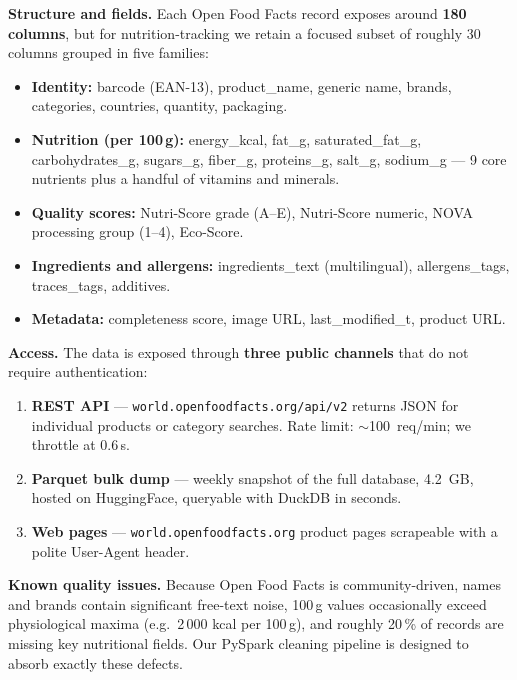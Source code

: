 \documentclass[a4paper,11pt,oneside,openany]{report}
\newcommand{\off}{Open Food Facts}
\begin{document}
\textbf{Structure and fields.} Each \off{} record exposes around
\textbf{180 columns}, but for nutrition-tracking we retain a focused
subset of roughly 30 columns grouped in five families:

\begin{itemize}[nosep]
  \item \textbf{Identity:} barcode (EAN-13), product\_name, generic
        name, brands, categories, countries, quantity, packaging.
  \item \textbf{Nutrition (per 100\,g):} energy\_kcal, fat\_g,
        saturated\_fat\_g, carbohydrates\_g, sugars\_g, fiber\_g,
        proteins\_g, salt\_g, sodium\_g --- 9 core nutrients plus
        a handful of vitamins and minerals.
  \item \textbf{Quality scores:} Nutri-Score grade (A--E),
        Nutri-Score numeric, NOVA processing group (1--4), Eco-Score.
  \item \textbf{Ingredients and allergens:} ingredients\_text
        (multilingual), allergens\_tags, traces\_tags, additives.
  \item \textbf{Metadata:} completeness score, image URL,
        last\_modified\_t, product URL.
\end{itemize}

\textbf{Access.} The data is exposed through \textbf{three public
channels} that do not require authentication:

\begin{enumerate}[nosep]
  \item \textbf{REST API} --- \texttt{world.openfoodfacts.org/api/v2}
        returns JSON for individual products or category searches.
        Rate limit: $\sim$100~req/min; we throttle at 0.6\,s.
  \item \textbf{Parquet bulk dump} --- weekly snapshot of the full
        database, 4.2~GB, hosted on HuggingFace, queryable with
        DuckDB in seconds.
  \item \textbf{Web pages} --- \texttt{world.openfoodfacts.org}
        product pages scrapeable with a polite User-Agent header.
\end{enumerate}

\textbf{Known quality issues.} Because \off{} is community-driven,
names and brands contain significant free-text noise, 100\,g
values occasionally exceed physiological maxima (e.g.\ 2\,000 kcal
per 100\,g), and roughly 20\,\% of records are missing key
nutritional fields. Our PySpark cleaning pipeline is designed to
absorb exactly these defects.
\end{document}

